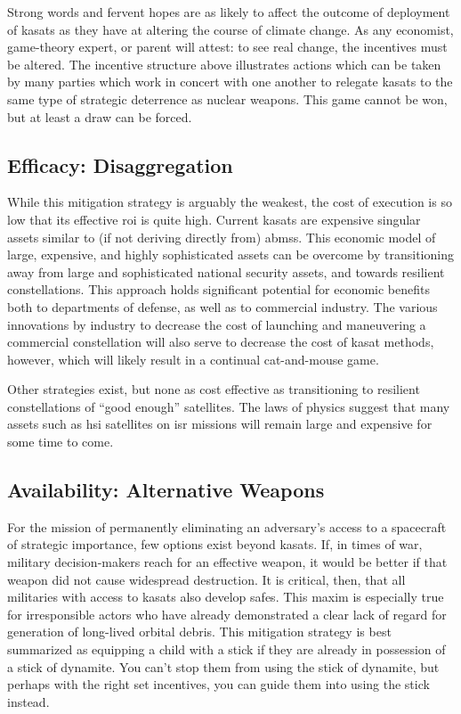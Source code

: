 Strong words and fervent hopes are as likely to affect the outcome of
deployment of \acp{kasat} as they have at altering the course of
climate change.  As any economist, game-theory expert, or parent will
attest: to see real change, the incentives must be altered.  The
incentive structure above illustrates actions which can be taken by
many parties which work in concert with one another to relegate
\acp{kasat} to the same type of strategic deterrence as nuclear
weapons.  This game cannot be won, but at least a draw can be forced.


\subsection*{Efficacy: Disaggregation}
While this mitigation strategy is arguably the weakest, the cost of
execution is so low that its effective \ac{roi} is quite high.
Current \acp{kasat} are expensive singular assets similar to (if not
deriving directly from) \acp{abms}.  This economic model of large,
expensive, and highly sophisticated assets can be overcome by
transitioning away from large and sophisticated national security
assets, and towards resilient constellations.  This approach holds
significant potential for economic benefits both to departments of
defense, as well as to commercial industry.\cite{big-risks} The
various innovations by industry to decrease the cost of launching and
maneuvering a commercial constellation will also serve to decrease the
cost of \ac{kasat} methods, however, which will likely result in a
continual cat-and-mouse game.

Other strategies exist, but none as cost effective as transitioning to
resilient constellations of ``good enough'' satellites.  The laws of
physics suggest that many assets such as \ac{hsi} satellites on
\ac{isr} missions will remain large and expensive for some time to
come.

\subsection*{Availability: Alternative Weapons}
For the mission of permanently eliminating an adversary's access to a
spacecraft of strategic importance, few options exist beyond
\acp{kasat}.  If, in times of war, military decision-makers reach for
an effective weapon, it would be better if that weapon did not cause
widespread destruction.  It is critical, then, that all militaries
with access to \acp{kasat} also develop \acp{safe}.  This maxim is
especially true for irresponsible actors who have already demonstrated
a clear lack of regard for generation of long-lived orbital debris.
This mitigation strategy is best summarized as equipping a child with
a stick if they are already in possession of a stick of dynamite.  You
can't stop them from using the stick of dynamite, but perhaps with the
right set incentives, you can guide them into using the stick instead.

